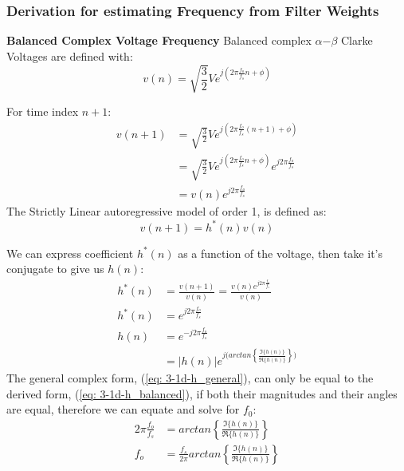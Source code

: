 \documentclass[12pt]{article}
\numberwithin{equation}{section}
\begin{document}
		\subsubsection{Derivation for estimating Frequency from Filter Weights}
			\noindent
			\textbf{Balanced Complex Voltage Frequency} \newline
			\noindent
			Balanced complex $\alpha$$-$$\beta$ Clarke Voltages are defined with:
			\vspace*{-0.6\baselineskip}
			\begin{equation}
			v(n) = \sqrt{\frac{3}{2}} V e^{j(2\pi \frac{f_{o}}{f_{s}} n + \phi)}
			\end{equation}
			
			For time index $n+1$:
			\vspace*{-\baselineskip}
			\begin{align}
			v(n+1)  &= \sqrt{\frac{3}{2}} V e^{j(2\pi \frac{f_{o}}{f_{s}} (n+1) + \phi)} \\
			&= \sqrt{\frac{3}{2}} V e^{j(2\pi \frac{f_{o}}{f_{s}} n + \phi)} e^{j 2 \pi \frac{f_{o}}{f_{s}}} \\
			&= v(n) e^{j 2 \pi \frac{f_{o}}{f_{s}}}
			\label{eq: 3-1d-u_n+1}
			\end{align}
			\noindent
			The Strictly Linear autoregressive model of order 1, is defined as:
			\begin{equation}
			v(n+1) = h^{*}(n) v(n) 
			\end{equation}
			
			We can express coefficient $h^{*}(n)$ as a function of the voltage, then take it's conjugate to give us $h(n)$:
			\vspace*{-\baselineskip}
			\begin{align}
			 h^{*}(n) &= \frac{v(n+1)}{v(n)} = \frac{v(n) e^{j 2 \pi \frac{f_{o}}{f_{s}}}}{v(n)} \\
			 h^{*}(n) &= e^{j 2 \pi \frac{f_{o}}{f_{s}}} \\
			 h(n) &= e^{-j 2 \pi \frac{f_{o}}{f_{s}}}  \label{eq: 3-1d-h_balanced}\\
			&= | h(n) | e^{j\big( arctan \left\{\frac{\Im\{h(n)\}}{\Re\{h(n)\}} \right\} \big)} \label{eq: 3-1d-h_general}
			\end{align}
			\noindent
			The general complex form, (\ref{eq: 3-1d-h_general}), can only be equal to the derived form, (\ref{eq: 3-1d-h_balanced}), if both their magnitudes and their angles are equal, therefore we can equate and solve for $f_0$: 
			\begin{align}
			2 \pi \frac{f_{o}}{f_{s}} &= arctan \left\{\frac{\Im\{h(n)\}}{\Re\{h(n)\}} \right\} \\
			f_{o} &= \frac{f_{s}}{2\pi} arctan \left\{\frac{\Im\{h(n)\}}{\Re\{h(n)\}} \right\}
			\label{eq: 3-1d-fo_CLMS:proof}
			\end{align}
			
\end{document}
